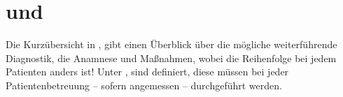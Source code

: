 % 
% 
% 
% 
% 
% 
% 
% 
% 
% 
% 
% 
% 

\begin{Literary}



\end{Literary}



\section{ und }


Die Kurzübersicht in 
, gibt einen
Überblick über die mögliche weiterführende Diagnostik, die
Anamnese und Maßnahmen, wobei die
Reihenfolge bei jedem Patienten anders ist!
Unter , 
 sind  definiert, diese 
müssen bei jeder Patientenbetreuung -- sofern angemessen --
durchgeführt werden.



